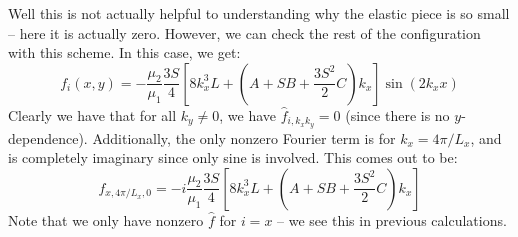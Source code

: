 \documentclass[reqno]{article}
\begin{document}
	Well this is not actually helpful to understanding why the elastic piece is so small -- here it is actually zero.
	However, we can check the rest of the configuration with this scheme. 
	In this case, we get:
	\begin{equation}
		f_{i} (x, y) = - \frac{\mu_2}{\mu_1} \frac{3 S}{4} 
		\left[
		8 k_x^3 L 
		+ \left( A + S B + \frac{3 S^2}{2} C \right)
		k_x 
		\right] \sin \left( 2 k_x x \right)
	\end{equation}
	Clearly we have that for all $k_y \neq 0$, we have $\hat{f}_{i, k_x k_y} = 0$ (since there is no $y$-dependence).
	Additionally, the only nonzero Fourier term is for $k_x = 4 \pi / L_x$, and is completely imaginary since only sine is involved. 
	This comes out to be:
	\begin{equation}
		f_{x, 4 \pi / L_x, 0} = - i \frac{\mu_2}{\mu_1} \frac{3 S}{4} 
		\left[
		8 k_x^3 L 
		+ \left( A + S B + \frac{3 S^2}{2} C \right)
		k_x 
		\right]
	\end{equation}
	Note that we only have nonzero $\hat{f}$ for $i = x$ -- we see this in previous calculations. 
	
\end{document}
